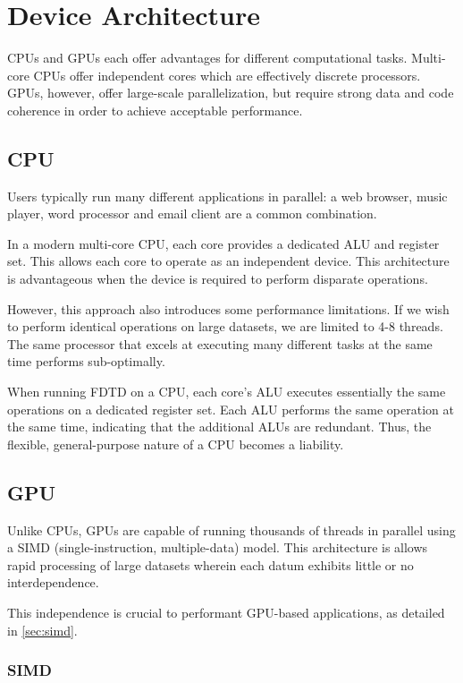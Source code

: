 \chapter{Device Architecture} \label{ch:device architecture}

CPUs and GPUs each offer advantages for different computational tasks. Multi-core CPUs offer independent cores which are effectively discrete processors. GPUs, however, offer large-scale parallelization, but require strong data and code coherence in order to achieve acceptable performance.


\section{CPU}

Users typically run many different applications in parallel: a web browser, music player, word processor and email client are a common combination.

In a modern multi-core CPU, each core provides a dedicated ALU and register set. This allows each core to operate as an independent device. This architecture is advantageous when the device is required to perform disparate operations.

However, this approach also introduces some performance limitations. If we wish to perform identical operations on large datasets, we are limited to 4-8 threads. The same processor that excels at executing many different tasks at the same time performs sub-optimally. 

When running FDTD on a CPU, each core's ALU executes essentially the same operations on a dedicated register set. Each ALU performs the same operation at the same time, indicating that the additional ALUs are redundant. Thus, the flexible, general-purpose nature of a CPU becomes a liability.

\section{GPU}

Unlike CPUs, GPUs are capable of running thousands of threads in parallel using a SIMD (single-instruction, multiple-data) model. This architecture is allows rapid processing of large datasets wherein each datum exhibits little or no interdependence. 

This independence is crucial to performant GPU-based applications, as detailed in \autoref{sec:simd}.

\subsection{SIMD}\label{sec:simd}

